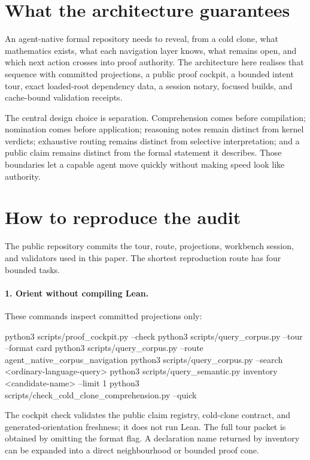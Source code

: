 \documentclass[11pt]{article}
\begin{document}
\section{What the architecture guarantees}\label{sec:conclusion}

An agent-native formal repository needs to reveal, from a cold clone, what
mathematics exists, what each navigation
layer knows, what remains open, and which next action crosses into proof
authority. The architecture here realises that sequence with committed
projections, a public proof cockpit, a bounded intent tour, exact loaded-root
dependency data, a session notary, focused builds, and cache-bound validation
receipts.

The central design choice is separation. Comprehension comes before
compilation; nomination comes before application; reasoning notes remain
distinct from kernel verdicts; exhaustive routing remains distinct from
selective interpretation; and a public claim remains distinct from the formal
statement it describes. Those boundaries let a capable agent move quickly
without making speed look like authority.

\appendix
\section{How to reproduce the audit}\label{app:repro}

The public repository commits the tour, route, projections, workbench session,
and validators used in this paper. The shortest reproduction route has four
bounded tasks.

\paragraph{1. Orient without compiling Lean.}
These commands inspect committed projections only:
\begin{routeblock}
python3 scripts/proof_cockpit.py --check
python3 scripts/query_corpus.py --tour --format card
python3 scripts/query_corpus.py --route agent_native_corpus_navigation
python3 scripts/query_corpus.py --search <ordinary-language-query>
python3 scripts/query_semantic.py inventory <candidate-name> --limit 1
python3 scripts/check_cold_clone_comprehension.py --quick
\end{routeblock}
The cockpit check validates the public claim registry, cold-clone contract, and
generated-orientation freshness; it does not run Lean.  The full tour packet is
obtained by omitting the format flag. A declaration name returned by inventory
can be expanded into a direct neighbourhood or bounded proof cone.
\end{document}
